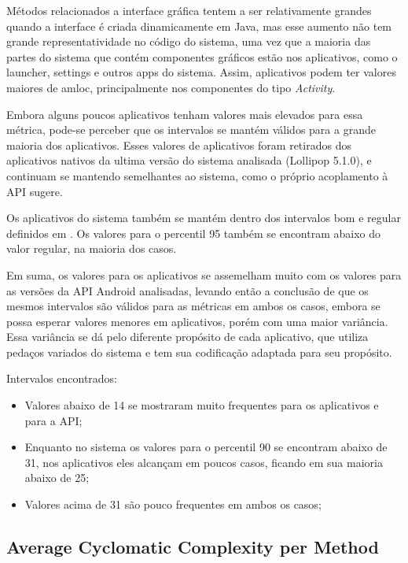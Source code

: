 Métodos relacionados a interface gráfica tentem a ser relativamente grandes quando a interface é criada dinamicamente em Java, mas esse aumento não tem grande representatividade no código do sistema, uma vez que a maioria das partes do sistema que contém componentes gráficos estão nos aplicativos, como o launcher, settings e outros apps do sistema. Assim, aplicativos podem ter valores maiores de amloc, principalmente nos componentes do tipo \textit{Activity}.

Embora alguns poucos aplicativos tenham valores mais elevados para essa métrica, pode-se perceber que os intervalos se mantém válidos para a grande maioria dos aplicativos. Esses valores de aplicativos foram retirados dos aplicativos nativos da ultima versão do sistema analisada (Lollipop 5.1.0), e continuam se mantendo semelhantes ao sistema, como o próprio acoplamento à API sugere. 

Os aplicativos do sistema também se mantém dentro dos intervalos bom e regular definidos em . Os valores para o percentil 95 também se encontram abaixo do valor regular, na maioria dos casos.

Em suma, os valores para os aplicativos se assemelham muito com os valores para as versões da API Android analisadas, levando então a conclusão de que os mesmos intervalos são válidos para as métricas em ambos os casos, embora se possa esperar valores menores em aplicativos, porém com uma maior variância. Essa variância se dá pelo diferente propósito de cada aplicativo, que utiliza pedaços variados do sistema e tem sua codificação adaptada para seu propósito.

Intervalos encontrados:

\begin{itemize}
\item Valores abaixo de 14 se mostraram muito frequentes para os aplicativos e para a API;
\item Enquanto no sistema os valores para o percentil 90 se encontram abaixo de 31, nos aplicativos eles alcançam em poucos casos, ficando em sua maioria abaixo de 25;
\item Valores acima de 31 são pouco frequentes em ambos os casos;
\end{itemize}

\subsection{Average Cyclomatic Complexity per Method}


